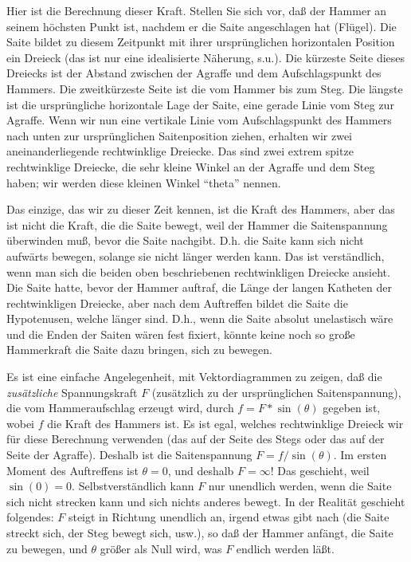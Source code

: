 Hier ist die Berechnung dieser Kraft.
Stellen Sie sich vor, daß der Hammer an seinem höchsten Punkt ist, nachdem er die Saite angeschlagen hat (Flügel).
Die Saite bildet zu diesem Zeitpunkt mit ihrer ursprünglichen horizontalen Position ein Dreieck (das ist nur eine idealisierte Näherung, s.u.).
Die kürzeste Seite dieses Dreiecks ist der Abstand zwischen der Agraffe und dem Aufschlagspunkt des Hammers.
Die zweitkürzeste Seite ist die vom Hammer bis zum Steg.
Die längste ist die ursprüngliche horizontale Lage der Saite, eine gerade Linie vom Steg zur Agraffe.
Wenn wir nun eine vertikale Linie vom Aufschlagspunkt des Hammers nach unten zur ursprünglichen Saitenposition ziehen, erhalten wir zwei aneinanderliegende rechtwinklige Dreiecke.
Das sind zwei extrem spitze rechtwinklige Dreiecke, die sehr kleine Winkel an der Agraffe und dem Steg haben; wir werden diese kleinen Winkel \enquote{theta} nennen.

Das einzige, das wir zu dieser Zeit kennen, ist die Kraft des Hammers, aber das ist nicht die Kraft, die die Saite bewegt, weil der Hammer die Saitenspannung überwinden muß, bevor die Saite nachgibt.
D.h. die Saite kann sich nicht aufwärts bewegen, solange sie nicht länger werden kann.
Das ist verständlich, wenn man sich die beiden oben beschriebenen rechtwinkligen Dreiecke ansieht.
Die Saite hatte, bevor der Hammer auftraf, die Länge der langen Katheten der rechtwinkligen Dreiecke, aber nach dem Auftreffen bildet die Saite die Hypotenusen, welche länger sind.
D.h., wenn die Saite absolut unelastisch wäre und die Enden der Saiten wären fest fixiert, könnte keine noch so große Hammerkraft die Saite dazu bringen, sich zu bewegen.

Es ist eine einfache Angelegenheit, mit Vektordiagrammen zu zeigen, daß die \textit{zusätzliche} Spannungskraft $F$ (zusätzlich zu der ursprünglichen Saitenspannung), die vom Hammeraufschlag erzeugt wird, durch $f = F * \sin(\theta)$ gegeben ist, wobei $f$ die Kraft des Hammers ist.
Es ist egal, welches rechtwinklige Dreieck wir für diese Berechnung verwenden (das auf der Seite des Stegs oder das auf der Seite der Agraffe).
Deshalb ist die Saitenspannung $F = f / \sin(\theta)$.
Im ersten Moment des Auftreffens ist $\theta = 0$, und deshalb $F = \infty$!
Das geschieht, weil $\sin(0) = 0$.
Selbstverständlich kann $F$ nur unendlich werden, wenn die Saite sich nicht strecken kann und sich nichts anderes bewegt.
In der Realität geschieht folgendes: $F$ steigt in Richtung unendlich an, irgend etwas gibt nach (die Saite streckt sich, der Steg bewegt sich, usw.), so daß der Hammer anfängt, die Saite zu bewegen, und $\theta$ größer als Null wird, was $F$ endlich werden läßt.

